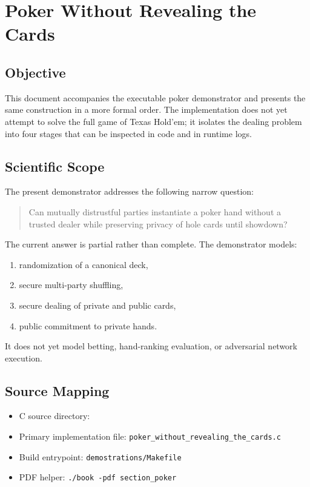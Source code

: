 \chapter{Poker Without Revealing the Cards}

\section{Objective}
This document accompanies the executable poker demonstrator and presents the
same construction in a more formal order. The implementation does not yet
attempt to solve the full game of Texas Hold'em; it isolates the dealing
problem into four stages that can be inspected in code and in runtime logs.

\section{Scientific Scope}
The present demonstrator addresses the following narrow question:

\begin{quote}
Can mutually distrustful parties instantiate a poker hand without a trusted
dealer while preserving privacy of hole cards until showdown?
\end{quote}

The current answer is partial rather than complete. The demonstrator models:
\begin{enumerate}
    \item randomization of a canonical deck,
    \item secure multi-party shuffling,
    \item secure dealing of private and public cards,
    \item public commitment to private hands.
\end{enumerate}

It does not yet model betting, hand-ranking evaluation, or adversarial network
execution.

\section{Source Mapping}
\begin{itemize}
    \item C source directory:
    \item Primary implementation file:
    \texttt{poker\_without\_revealing\_the\_cards.c}
    \item Build entrypoint: \texttt{demostrations/Makefile}
    \item PDF helper: \texttt{./book -pdf section\_poker}
\end{itemize}

